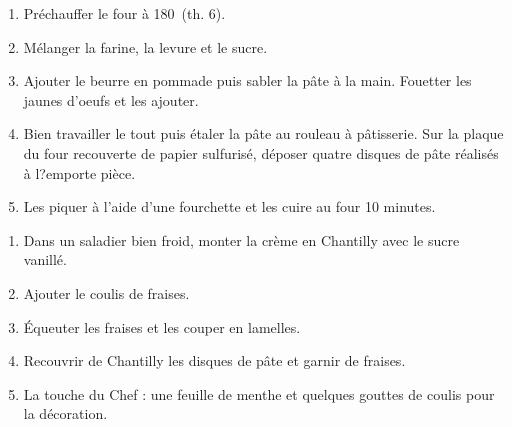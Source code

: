 \prep{}



\begin{ingredients}
\end{ingredients}


\begin{recipe}
  \begin{enumerate}

  \item   Pr\'echauffer le four \`a 180\C\ (th. 6).

  \item M\'elanger la farine, la levure et le sucre.

  \item Ajouter le beurre en pommade puis sabler la p\^ate \`a la
    main.  Fouetter les jaunes d'oeufs et les ajouter.

  \item Bien travailler le tout puis \'etaler la p\^ate au rouleau \`a
    p\^atisserie.  Sur la plaque du four recouverte de papier
    sulfuris\'e, d\'eposer quatre disques de p\^ate r\'ealis\'es \`a
    l?emporte pi\`ece.

  \item Les piquer \`a l'aide d'une fourchette et les cuire au four 10
    minutes.

  \end{enumerate}
\end{recipe}



\begin{ingredients}
\end{ingredients}


\begin{recipe}
  \begin{enumerate}

  \item Dans un saladier bien froid, monter la cr\`eme en Chantilly
    avec le sucre vanill\'e.

  \item Ajouter le coulis de fraises.

  \item \'Equeuter les fraises et les couper en lamelles.

  \item Recouvrir de Chantilly les disques de p\^ate et garnir de
    fraises.

  \item La touche du Chef : une feuille de menthe et quelques gouttes
    de coulis pour la d\'ecoration.

  \end{enumerate}
\end{recipe}

